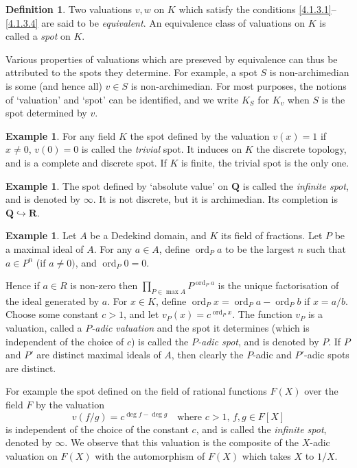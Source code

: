 \documentclass[10pt,leqno]{article}
\theoremstyle{definition}
\newtheorem{defi}[theo]{Definition}
\newtheorem{exam}[theo]{Example}
\def\QQ{\mathbf{Q}}
\def\RR{\mathbf{R}}
\DeclareMathOperator{\ord}{ord}
\def\qw#1{`#1'}
\begin{document}
\begin{defi}
\label{4.1.4}
Two valuations $v,w$ on $K$ which satisfy the conditions \eqref{4.1.3.1}--\eqref{4.1.3.4} are said to be \emph{equivalent}.
An equivalence class of valuations on $K$ is called a \emph{spot} on $K$.
\end{defi}


Various properties of valuations which are preseved by equivalence can thus be attributed to the spots they determine.
For example, a spot $S$ is non-archi\-median is some (and hence all) $v \in S$ is non-archimedian.
For most purposes, the notions of \qw{valuation} and \qw{spot} can be identified, and we write $K_S$ for $K_v$ when $S$ is the spot determined by $v$.


\begin{exam}
\label{4.1.5}
For any field $K$ the spot defined by the valuation $v(x) = 1$ if $x \not=0$, $v(0) = 0$ is called the \emph{trivial} spot.
It induces on $K$ the discrete topology, and is a complete and discrete spot.
If $K$ is finite, the trivial spot is the only one.
\end{exam}


\begin{exam}
\label{4.1.6}
The spot defined by \qw{absolute value} on $\QQ$ is called the \emph{infinite spot}, and is denoted by $\infty$.
It is not discrete, but it is archimedian.
Its completion is $\QQ \hookrightarrow \RR$.
\end{exam}


\begin{exam}
\label{4.1.7}
Let $A$ be a Dedekind domain, and $K$ its field of fractions.
Let $P$ be a maximal ideal of $A$.
For any $a \in A$, define $\ord_P a$ to be the largest $n$ such that $a \in P^n$ (if $a \not= 0)$, and $\ord_P 0 = 0$.

Hence if $a \in R$ is non-zero then $\prod_{P \in \max A} P^{\ord_P a}$ is the unique factorisation of the ideal generated by $a$.
For $x \in K$, define $\ord_P x = \ord_P a - \ord_P b$ if $x = a/b$.
Choose some constant $c > 1$, and let $v_P(x) = c^{\ord_P x}$.
The function $v_P$ is a valuation, called a \emph{$P$-adic valuation} and the spot it determines (which is independent of the choice of $c$) is called the \emph{$P$-adic spot}, and is denoted by $P$.
If $P$ and $P'$ are distinct maximal ideals of $A$, then clearly the $P$-adic and $P'$-adic spots are distinct.

For example the spot defined on the field of rational functions $F(X)$ over the field $F$ by the valuation
\[
v(f/g) = c^{\deg f - \deg g}
\quad
\text{where $c > 1$, $f,g \in F[X]$}
\]
is independent of the choice of the constant $c$, and is called the \emph{infinite spot}, denoted by $\infty$.
We observe that this valuation is the composite of the $X$-adic valuation on $F(X)$ with the automorphism of $F(X)$ which takes $X$ to $1/X$.
\end{exam}
\end{document}
